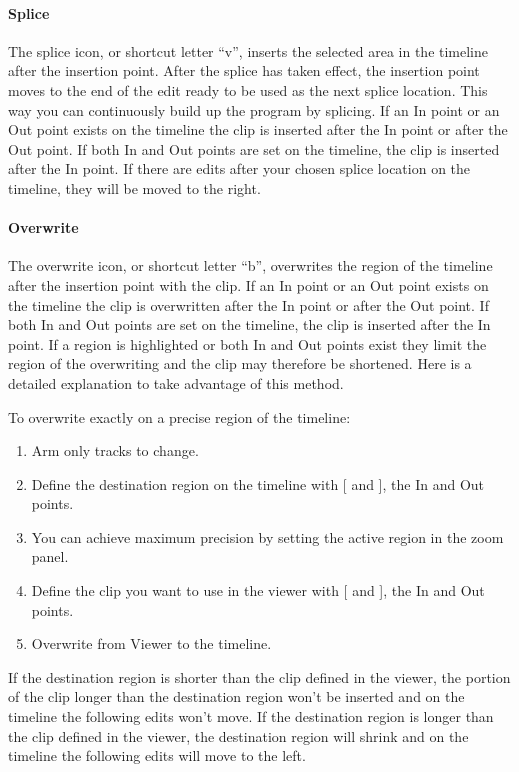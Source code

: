 \paragraph{Splice} The splice icon, or shortcut letter “v”, inserts the selected area in the timeline after the insertion point.  After the splice has taken effect, the insertion point moves to the end of the edit ready to be used as the next splice location. This way you can continuously build up the program by splicing.
If an In point or an Out point exists on the timeline the clip is inserted after the In point or after the Out point. If both In and Out points are set on the timeline, the clip is inserted after the In point. If there are edits after your chosen splice location on the timeline, they will be moved to the right.

\paragraph{Overwrite} The overwrite icon, or shortcut letter “b”, overwrites the region of the timeline after the insertion point with the clip. If an In point or an Out point exists on the timeline the clip is overwritten after the In point or after the Out point. If both In and Out points are set on the timeline, the clip is inserted after the In point. If a region is highlighted or both In and Out points exist they limit the region of the overwriting and the clip may therefore be shortened. Here is a detailed explanation to take advantage of this method.

To overwrite exactly on a precise region of the timeline:

\begin{enumerate} [noitemsep]
    \item Arm only tracks to change.
    \item Define the destination region on the timeline with [ and ], the In and Out points.
    \item You can achieve maximum precision by setting the active region in the zoom panel.
    \item Define the clip you want to use in the viewer with [ and ], the In and Out points.
    \item Overwrite from Viewer to the timeline.
\end{enumerate}

If the destination region is shorter than the clip defined in the viewer, the portion of the clip longer than the destination region won't be inserted and on the timeline the following edits won't move.
If the destination region is longer than the clip defined in the viewer, the destination region will shrink and on the timeline the following edits will move to the left.

